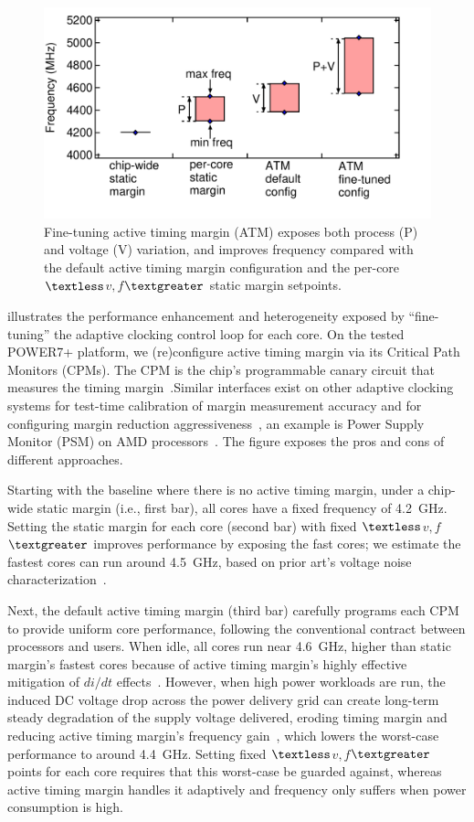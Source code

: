 \begin{figure}[t]
  \centering
  \includegraphics[trim=0 40 0 10,clip,width=.75\linewidth]{graphs/process/schedule-space.pdf}
  \caption{Fine-tuning active timing margin (ATM) exposes both process (P) and voltage (V) variation, and improves frequency compared with the default active timing margin configuration and the per-core $\textless$$v,f$$\textgreater$ static margin setpoints.}

  \label{fig:motivate-variation}
\end{figure}

 illustrates the performance enhancement and heterogeneity exposed by ``fine-tuning'' the adaptive clocking control loop for each core. On the tested POWER7+ platform, we (re)configure active timing margin via its Critical Path Monitors (CPMs). The CPM is the chip's programmable canary circuit that measures the timing margin~\cite{lefurgy2011active, drake2013single}.Similar interfaces exist on other adaptive clocking systems for test-time calibration of margin measurement accuracy and for configuring margin reduction aggressiveness~\cite{mericas2014performance,webel2015robust,berry2018ibm}, an example is Power Supply Monitor (PSM) on AMD processors~\cite{grenat20145}. The figure exposes the pros and cons of different approaches.

Starting with the baseline where there is no active timing margin, under a chip-wide static margin (i.e., first bar), all cores have a fixed frequency of 4.2~GHz. Setting the static margin for each core (second bar) with fixed $\textless$$v,f$$\textgreater$ improves performance by exposing the fast cores; we estimate the fastest cores can run around 4.5~GHz, based on prior art's voltage noise characterization~\cite{zu2015adaptive}.

Next, the default active timing margin (third bar) carefully programs each CPM to provide uniform core performance, following the conventional contract between processors and users. When idle, all cores run near 4.6~GHz, higher than static margin's fastest cores because of active timing margin's highly effective mitigation of $di/dt$ effects~\cite{lefurgy2011active}. However, when high power workloads are run, the induced DC voltage drop across the power delivery grid can create long-term steady degradation of the supply voltage delivered, eroding timing margin and reducing active timing margin's frequency gain~\cite{zu2015adaptive}, which lowers the worst-case performance to around 4.4~GHz. Setting fixed $\textless$$v,f$$\textgreater$ points for each core requires that this worst-case be guarded against, whereas active timing margin handles it adaptively and frequency only suffers when power consumption is high.

